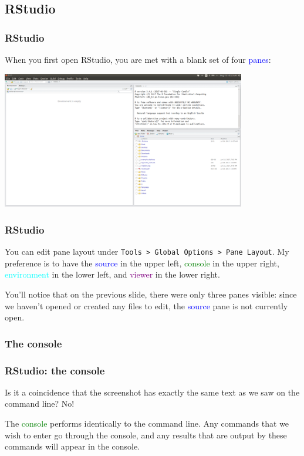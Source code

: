 \documentclass[11pt]{beamer}
\newcommand{\myframe}[1]{\begin{frame} \frametitle{#1}}
\begin{document}
\subsection{RStudio}
\myframe{RStudio}
When you first open RStudio, you are met with a blank set of four \textcolor{blue}{panes}:
\begin{center}
\includegraphics[width = 0.8\textwidth]{figs/rstudio.png}
\end{center}
\end{frame}

\myframe{RStudio}
You can edit pane layout under \texttt{Tools > Global Options > Pane Layout}. My preference is to have the \textcolor{blue}{source} in the upper left, \textcolor{green}{console} in the upper right, \textcolor{cyan}{environment} in the lower left, and \textcolor{purple}{viewer} in the lower right.

You'll notice that on the previous slide, there were only three panes visible: since we haven't opened or created any files to edit, the \textcolor{blue}{source} pane is not currently open.
\end{frame}

\subsubsection{The console}
\myframe{RStudio: the console}
Is it a coincidence that the screenshot has exactly the same text as we saw on the command line? No! 

The \textcolor{green}{console} performs identically to the command line. Any commands that we wish to enter go through the console, and any results that are output by these commands will appear in the console. 

\end{frame}
\end{document}
